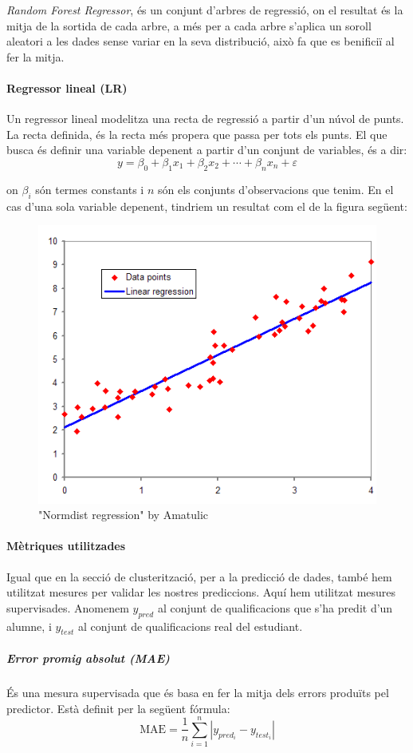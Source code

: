 \documentclass[12pt,a4paper,catalan]{article}
\begin{document}
\textit{Random Forest Regressor}, és un conjunt d'arbres de regressió, on el resultat és la mitja de la sortida de cada arbre, a més per a cada arbre s'aplica un soroll aleatori a les dades sense variar en la seva distribució, això fa que es benificiï al fer la mitja. 

\newpage

\paragraph{Regressor lineal (LR)}
Un regressor lineal modelitza una recta de regressió a partir d'un núvol de punts. La recta definida, és la recta més propera que passa per tots els punts. El que busca és definir una variable depenent a partir d'un conjunt de variables, és a dir:
$$
y =\beta_0+\beta_1 x_1+\beta_2 x_2+ \cdots + \beta_n x_n + \varepsilon
$$

on $\beta_i$ són termes constants i $n$ són els conjunts d'observacions que tenim. En el cas d'una sola variable depenent, tindriem un resultat com el de la figura següent:

\begin{figure}[h]
\centering
\includegraphics[width=.5\linewidth]{img/linearregression.png}
\caption{"Normdist regression" by Amatulic}
\end{figure}

\paragraph{Mètriques utilitzades}
Igual que en la secció de clusterització, per a la predicció de dades, també hem utilitzat mesures per validar les nostres prediccions. Aquí hem utilitzat mesures supervisades. Anomenem $y_{pred}$ al conjunt de qualificacions que s'ha predit d'un alumne, i $y_{test}$ al conjunt de qualificacions real del estudiant.

\subparagraph{Error promig absolut (MAE)}
És una mesura supervisada que és basa en fer la mitja dels errors produïts pel predictor. Està definit per la següent fórmula:
$$ \mathrm{MAE} = \frac{1}{n}\sum_{i=1}^n \left| y_{pred_i}-y_{test_i}\right| $$
\end{document}
